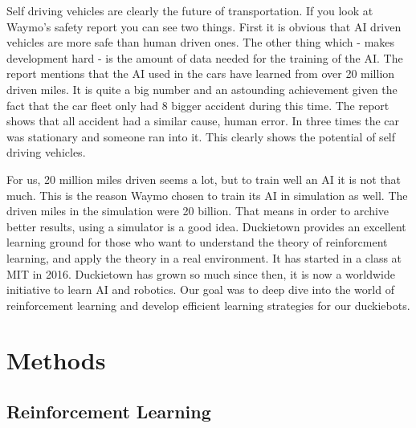 \documentclass{article}
\begin{document}
Self driving vehicles are clearly the future of transportation. If you look at Waymo's \cite{waymo}  safety report you can see two things. First it is obvious that AI driven vehicles are more safe than human driven ones. The other thing which - makes development hard - is the amount of data needed for the training of the AI. 
The report mentions that the AI used in the cars have learned from over 20 million driven miles. It is quite a big number and an astounding achievement given the fact that the car fleet only had 8 bigger accident during this time. The report shows that all accident had a similar cause, human error. In three times the car was stationary and someone ran into it. This clearly shows the potential of self driving vehicles.

For us, 20 million miles driven seems a lot, but to train well an AI it is not that much. This is the reason Waymo chosen to train its AI in simulation as well. The driven miles in the simulation were 20 billion. That means in order to archive better results, using a simulator is a good idea. Duckietown provides an excellent learning ground for those who want to understand the theory of reinforcment learning, and apply the theory in a real environment. 
It has started in a class at MIT in 2016. Duckietown has grown so much since then, it is now a worldwide initiative to learn AI and robotics. Our goal was to deep dive into the world of reinforcement learning and develop efficient learning strategies for our duckiebots.

\section{\large{Methods}}

\subsection{\normalsize{Reinforcement Learning}}
\end{document}
